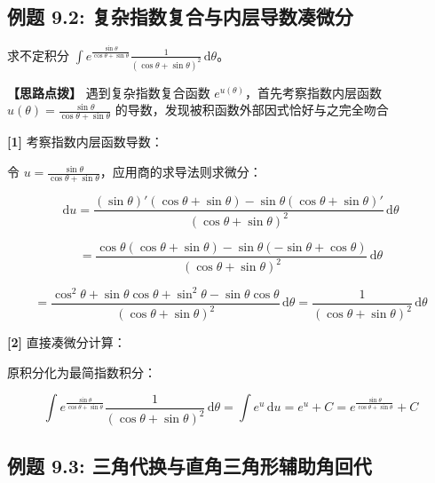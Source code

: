 \documentclass[11pt,a4paper,UTF8]{ctexart}
\begin{document}
\subsection{例题 9.2: 复杂指数复合与内层导数凑微分}

求不定积分 $\int e^{\frac{\sin\theta}{\cos\theta+\sin\theta}}\frac{1}{(\cos\theta+\sin\theta)^2}\,\mathrm{d}\theta$。

\textbf{\color{DeepPurple}【思路点拨】} 遇到复杂指数复合函数 $e^{u(\theta)}$，首先考察指数内层函数 $u(\theta) = \frac{\sin\theta}{\cos\theta+\sin\theta}$ 的导数，发现被积函数外部因式恰好与之完全吻合


\begin{solbox}[分步推导与答题规范]
\textbf{[1]} 考察指数内层函数导数：

令 $u = \frac{\sin\theta}{\cos\theta+\sin\theta}$，应用商的求导法则求微分：


\begin{equation*}
\mathrm{d}u = \frac{(\sin\theta)'(\cos\theta+\sin\theta) - \sin\theta(\cos\theta+\sin\theta)'}{(\cos\theta+\sin\theta)^2}\,\mathrm{d}\theta
\end{equation*}



\begin{equation*}
= \frac{\cos\theta(\cos\theta+\sin\theta) - \sin\theta(-\sin\theta+\cos\theta)}{(\cos\theta+\sin\theta)^2}\,\mathrm{d}\theta
\end{equation*}



\begin{equation*}
= \frac{\cos^2\theta + \sin\theta\cos\theta + \sin^2\theta - \sin\theta\cos\theta}{(\cos\theta+\sin\theta)^2}\,\mathrm{d}\theta = \frac{1}{(\cos\theta+\sin\theta)^2}\,\mathrm{d}\theta
\end{equation*}


\textbf{[2]} 直接凑微分计算：

原积分化为最简指数积分：


\begin{equation*}
\int e^{\frac{\sin\theta}{\cos\theta+\sin\theta}}\frac{1}{(\cos\theta+\sin\theta)^2}\,\mathrm{d}\theta = \int e^u\,\mathrm{d}u = e^u + C = e^{\frac{\sin\theta}{\cos\theta+\sin\theta}} + C
\end{equation*}

\end{solbox}


\subsection{例题 9.3: 三角代换与直角三角形辅助角回代}
\end{document}
